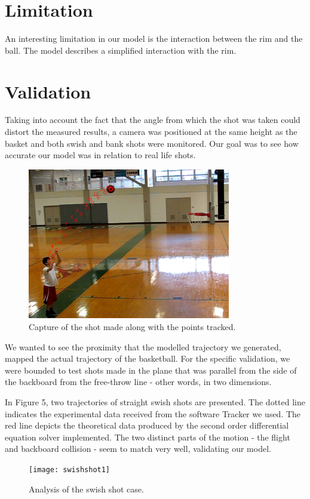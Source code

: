 \documentclass[twocolumn]{IEEEtran}
\begin{document}
\section{Limitation}
An interesting limitation in our model is the interaction between the rim and the ball. The model describes a simplified interaction with the rim. 

\section{Validation}
Taking into account the fact that the angle from which the shot was taken could distort the measured results, a camera was positioned at the same height as the basket and both swish and bank shots were monitored. Our goal was to see how accurate our model was in relation to real life shots. 
\begin{figure}[!ht]
\includegraphics[height=2.6in]{1}
\caption{Capture of the shot made along with the points tracked.}
\end{figure}

We wanted to see the proximity that the modelled trajectory we generated, mapped the actual trajectory of the basketball. For the specific validation, we were bounded to test shots made in the plane that was parallel from the side of the backboard from the free-throw line - other words, in two dimensions.

In Figure 5, two trajectories of straight swish shots are presented. The dotted line indicates the experimental data received from the software Tracker we used. The red line depicts the theoretical data produced by the second order differential equation solver implemented. The two distinct parts of the motion - the flight and backboard collision - seem to match very well, validating our model.
\begin{figure}[!ht]
\texttt{[image: swishshot1]}
\caption{Analysis of the swish shot case.}
\end{figure}
\end{document}
